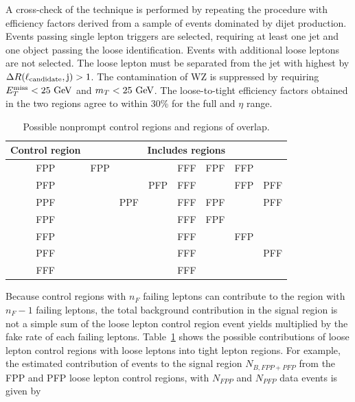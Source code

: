 A cross-check of the technique is performed by 
repeating the procedure with efficiency factors derived from a 
sample of events dominated by dijet production. 
Events passing single lepton triggers are selected, requiring at least one jet and one
{\lcand} object passing the loose identification. Events with additional loose leptons are not selected.
The loose lepton must be separated from the jet with highest \pt by $\Delta R(\ell_{\rm candidate}, \mathrm{j}) > 1$.
The contamination of WZ is suppressed by requiring $E_T^{\text{miss}} < 25\,\,\text{Ge\hspace{-.08em}V}$  and  $m_T < 25\,\,\text{Ge\hspace{-.08em}V}$. 
The loose-to-tight efficiency factors obtained in the two regions
agree to within 30\% for the full \PT and $\eta$ range.

\begin{table}[htbp]
    \centering
    \begin{tabular}{|c|c|c|c|c|c|c|c| }
\hline %
Control region &  \multicolumn{7}{c|}{Includes regions}                                                                 \\
\hline %
FPP & FPP &     &     & FFF & FPF & FFP &        \\
PFP &     &     & PFP & FFF &     & FFP & PFF    \\
PPF &     & PPF &     & FFF & FPF &     & PFF    \\
FPF &     &     &     & FFF & FPF &     &        \\
FFP &     &     &     & FFF &     & FFP &        \\
PFF &     &     &     & FFF &     &     & PFF    \\
FFF &     &     &     & FFF &     &     &        \\
\hline %
     \end{tabular}
    \caption{ Possible nonprompt control regions and regions of overlap.}
    \label{tab:nonpromptRegionOverlap}
\end{table}

Because control regions with $n_{F}$ failing leptons can contribute to the region with
$n_{F}-1$ failing leptons,
the total background contribution in the signal region is not a simple sum of the 
loose lepton control region event yields multiplied by the fake rate of each failing leptons. 
Table~\ref{tab:nonpromptRegionOverlap} shows the possible contributions 
of loose lepton control regions with loose leptons into tight lepton regions.
For example,
the estimated contribution of events to the signal region $N_{B,FPP+PFP}$ 
from the FPP and PFP loose lepton control regions, with $N_{FPP}$ and $N_{PFP}$ data events is given by

